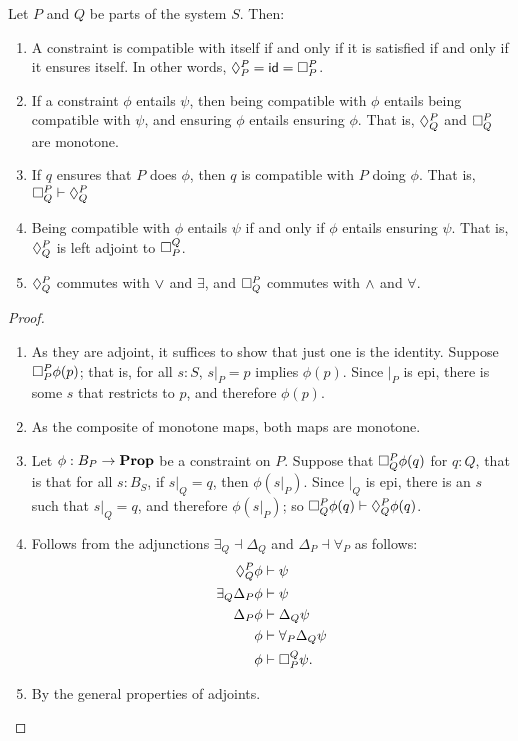     \begin{claim} Let $P$ and $Q$ be parts of the system $S$. Then:
    \begin{enumerate}
        \item A constraint is compatible with itself if and only if it is satisfied if and only if it ensures itself. In other words, $\compat{P}{P} = \id = \ensure{P}{P}$.
        \item If a constraint $\phi$ entails $\psi$, then being compatible with $\phi$ entails being compatible with $\psi$, and ensuring $\phi$ entails ensuring $\phi$. That is, $\compat{P}{Q}$ and $\ensure{P}{Q}$ are monotone.
        \item If $q$ ensures that $P$ does $\phi$, then $q$ is compatible with $P$ doing $\phi$. That is, $\ensure{P}{Q} \vdash \compat{P}{Q}$
        \item Being compatible with $\phi$ entails $\psi$ if and only if $\phi$ entails ensuring $\psi$. That is, $\compat{P}{Q}$ is left adjoint to $\ensure{Q}{P}$.
        \item $\compat{P}{Q}$ commutes with $\join$ and $\exists$, and $\ensure{P}{Q}$ commutes with $\meet$ and $\forall$.
        
    \end{enumerate}
    \end{claim}
    \begin{proof}
    \begin{enumerate}
        \item As they are adjoint, it suffices to show that just one is the identity. Suppose $\ensure{P}{P}\phi(p)$; that is, for all $s : S$, $s|_P = p$ implies $\phi(p)$. Since $|_P$ is epi, there is some $s$ that restricts to $p$, and therefore $\phi(p)$.
        \item As the composite of monotone maps, both maps are monotone.
        \item Let $\phi : B_P \to \Prop$ be a constraint on $P$. Suppose that $\ensure{P}{Q}\phi(q)$ for $q : Q$, that is that for all $s : B_S$, if $s|_Q = q$, then $\phi(s|_P)$. Since $|_Q$ is epi, there is an $s$ such that $s|_Q = q$, and therefore $\phi(s|_P)$; so $\ensure{P}{Q}\phi(q) \vdash \compat{P}{Q}\phi(q)$.
        \item Follows from the adjunctions $\exists_Q \dashv \Delta_Q$ and $\Delta_P \dashv \forall_P$ as follows:
        \begin{align*}
            \compat{P}{Q} \phi &\vdash \psi \\ 
            \exists_Q \Delta_P \phi &\vdash \psi \\
            \Delta_P \phi &\vdash \Delta_Q \psi \\ 
            \phi &\vdash \forall_P \Delta_Q \psi \\
            \phi &\vdash \ensure{Q}{P} \psi.
        \end{align*}
        \item By the general properties of adjoints.
        
    \end{enumerate}
    \end{proof}
    
